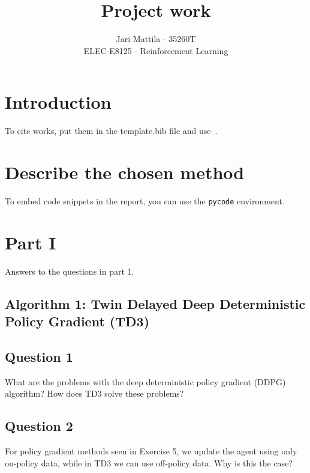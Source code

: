 \documentclass[12pt]{article}
\begin{document}
 
\title{Project work}
\author{Jari Mattila - 35260T\\
ELEC-E8125 - Reinforcement Learning}

\maketitle
\section*{Introduction}

To cite works, put them in the template.bib file and use~\cite{sutton_reinforcement_2018}.



\section*{Describe the chosen method}
To embed code snippets in the report, you can use the \texttt{pycode} environment.



\section*{Part I}

Answers to the questions in part 1.
\newline

\subsection*{Algorithm 1: Twin Delayed Deep Deterministic Policy Gradient (TD3)}


\subsection*{Question 1}

What are the problems with the deep deterministic policy gradient (DDPG) algorithm? 
How does TD3 solve these problems? 

\subsection*{Question 2}

For policy gradient methods seen in Exercise 5, we update the agent using only on-policy data,
while in TD3 we can use off-policy data. Why is this the case?

\pagebreak
\end{document}
